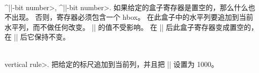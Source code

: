 \\^|\unhbox|-bit number>, ^|\unhcopy|-bit number>.\enskip
如果给定的盒子寄存器是置空的，那么什么也不出现。%
否则，寄存器必须包含一个 hbox。%
在此盒子中的水平列要追加到当前水平列，而不做任何改变。%
|\spacefactor| 的值不受影响。%
在 |\unhbox| 后此盒子寄存器变成置空的，在 |\unhcopy| 后它保持不变。

\\\<vertical rule>.\enskip
把给定的标尺追加到当前列，并且把 |\spacefactor| 设置为 1000。

